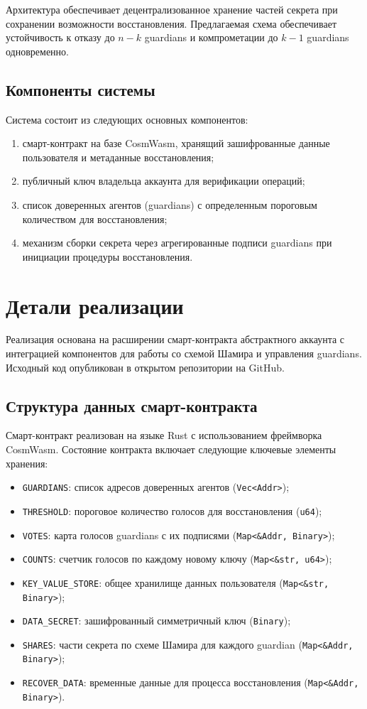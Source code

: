 Архитектура обеспечивает децентрализованное хранение частей секрета при сохранении возможности восстановления. Предлагаемая схема обеспечивает устойчивость к отказу до $n-k$ guardians и компрометации до $k-1$ guardians одновременно.

\subsection{Компоненты системы}

Система состоит из следующих основных компонентов:
\begin{enumerate}
\item
смарт-контракт на базе CosmWasm, хранящий зашифрованные данные пользователя и метаданные восстановления;
\item
публичный ключ владельца аккаунта для верификации операций;
\item
список доверенных агентов (guardians) с определенным пороговым количеством для восстановления;
\item
механизм сборки секрета через агрегированные подписи guardians при инициации процедуры восстановления.
\end{enumerate}


\section{Детали реализации}

Реализация основана на расширении смарт-контракта абстрактного аккаунта с интеграцией компонентов для работы со схемой Шамира и управления guardians. Исходный код опубликован в открытом репозитории на GitHub.

\subsection{Структура данных смарт-контракта}

Смарт-контракт реализован на языке Rust с использованием фреймворка CosmWasm. Состояние контракта включает следующие ключевые элементы хранения:

\begin{itemize}
\item
\texttt{GUARDIANS}: список адресов доверенных агентов (\texttt{Vec<Addr>});
\item
\texttt{THRESHOLD}: пороговое количество голосов для восстановления (\texttt{u64});
\item
\texttt{VOTES}: карта голосов guardians с их подписями (\texttt{Map<\&Addr, Binary>});
\item
\texttt{COUNTS}: счетчик голосов по каждому новому ключу (\texttt{Map<\&str, u64>});
\item
\texttt{KEY\_VALUE\_STORE}: общее хранилище данных пользователя (\texttt{Map<\&str, Binary>});
\item
\texttt{DATA\_SECRET}: зашифрованный симметричный ключ (\texttt{Binary});
\item
\texttt{SHARES}: части секрета по схеме Шамира для каждого guardian (\texttt{Map<\&Addr, Binary>});
\item
\texttt{RECOVER\_DATA}: временные данные для процесса восстановления (\texttt{Map<\&Addr, Binary>}).
\end{itemize}

